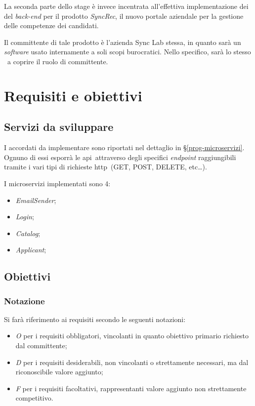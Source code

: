 La seconda parte dello stage è invece incentrata all'effettiva implementazione dei  del \textit{back-end} per il prodotto \textit{SyncRec}, il nuovo portale aziendale per la gestione delle competenze dei candidati.

Il committente di tale prodotto è l'azienda Sync Lab stessa, in quanto sarà un \textit{software} usato internamente a soli scopi burocratici.
Nello specifico, sarà lo stesso \fabio\ a coprire il ruolo di committente.

\section{Requisiti e obiettivi}

\subsection{Servizi  da sviluppare}

I  accordati da implementare sono riportati nel dettaglio in \S\ref{prog-microservizi}. Ognuno di essi esporrà le \gls{api}\gloss\ attraverso degli specifici \textit{endpoint}
raggiungibili tramite i vari tipi di richieste \acrshort{http}\gloss\ (GET, POST, DELETE, etc\dots).

I microservizi implementati sono 4:
\begin{itemize}
	\item \textit{EmailSender};
	\item \textit{Login};
	\item \textit{Catalog};
	\item \textit{Applicant};
\end{itemize}



\subsection{Obiettivi}\label{obiettivi-stage}

\subsubsection*{Notazione}
Si farà riferimento ai requisiti secondo le seguenti notazioni:
\begin{itemize}
	\item \textit{O} per i requisiti obbligatori, vincolanti in quanto obiettivo primario richiesto dal committente;
	\item \textit{D} per i requisiti desiderabili, non vincolanti o strettamente necessari,
	ma dal riconoscibile valore aggiunto;
	\item \textit{F} per i requisiti facoltativi, rappresentanti valore aggiunto non strettamente 
	competitivo.
\end{itemize}

